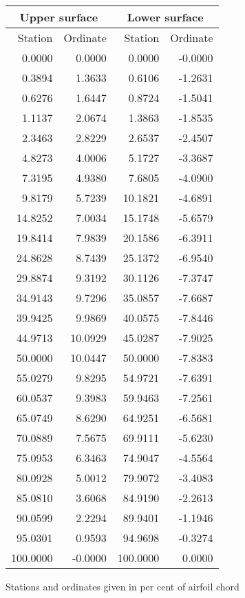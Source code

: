 \documentclass[11pt]{book}
\begin{document}
 \hspace{4mm}
 \begin{tabular}{|r|r|r|r|} \hline 
 \multicolumn{2}{|c|}{Upper surface} & \multicolumn{2}{|c|}{Lower surface} \\
 \hline
 Station & Ordinate & Station & Ordinate \\
 \hline
0.0000 & 0.0000 & 0.0000 & -0.0000 \\
0.3894 & 1.3633 & 0.6106 & -1.2631 \\
0.6276 & 1.6447 & 0.8724 & -1.5041 \\
1.1137 & 2.0674 & 1.3863 & -1.8535 \\
2.3463 & 2.8229 & 2.6537 & -2.4507 \\
4.8273 & 4.0006 & 5.1727 & -3.3687 \\
7.3195 & 4.9380 & 7.6805 & -4.0900 \\
9.8179 & 5.7239 & 10.1821 & -4.6891 \\
14.8252 & 7.0034 & 15.1748 & -5.6579 \\
19.8414 & 7.9839 & 20.1586 & -6.3911 \\
24.8628 & 8.7439 & 25.1372 & -6.9540 \\
29.8874 & 9.3192 & 30.1126 & -7.3747 \\
34.9143 & 9.7296 & 35.0857 & -7.6687 \\
39.9425 & 9.9869 & 40.0575 & -7.8446 \\
44.9713 & 10.0929 & 45.0287 & -7.9025 \\
50.0000 & 10.0447 & 50.0000 & -7.8383 \\
55.0279 & 9.8295 & 54.9721 & -7.6391 \\
60.0537 & 9.3983 & 59.9463 & -7.2561 \\
65.0749 & 8.6290 & 64.9251 & -6.5681 \\
70.0889 & 7.5675 & 69.9111 & -5.6230 \\
75.0953 & 6.3463 & 74.9047 & -4.5564 \\
80.0928 & 5.0012 & 79.9072 & -3.4083 \\
85.0810 & 3.6068 & 84.9190 & -2.2613 \\
90.0599 & 2.2294 & 89.9401 & -1.1946 \\
95.0301 & 0.9593 & 94.9698 & -0.3274 \\
100.0000 & -0.0000 & 100.0000 & 0.0000 \\
 \hline 
 \end{tabular}
 \vspace{8mm}

Stations and ordinates given in per cent of airfoil chord
\end{document}

